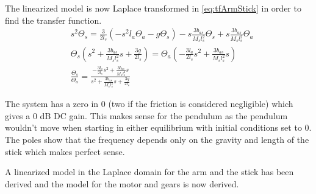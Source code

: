 The linearized model is now Laplace transformed in \autoref{eq:tfArmStick} in order to find the transfer function.
\begin{subequations}
\begin{flalign}
& s^2\Theta_s=\frac{3}{2l_s}\left(-s^2l_a\Theta_a -g\Theta_s\right)-s\frac{3b_{as}}{M_sl_s^2}\Theta_s+s\frac{3b_{as}}{M_sl_s^2}\Theta_a  \\
& \Theta_s\left(s^2+\frac{3b_{as}}{M_sl_s^2}s+\frac{3g}{2l_s}\right)=\Theta_a\left(-\frac{3l_a}{2l_s}s^2+\frac{3b_{as}}{M_sl_s^2}s\right)  \\
& \frac{\Theta_s}{\Theta_a}=\frac{-\frac{3l_a}{2l_s}s^2+\frac{3b_{as}}{M_sl_s^2}s}{s^2+\frac{3b_{as}}{M_sl_s^2}s+\frac{3g}{2l_s}} \label{eq:tfArmStick}
\end{flalign}
\end{subequations}

The system has a zero in 0 (two if the friction is considered negligible) which gives a 0 dB DC gain. This makes sense for the pendulum as the pendulum wouldn't move when starting in either equilibrium with initial conditions set to 0. The poles show that the frequency depends only on the gravity and length of the stick which makes perfect sense.

A linearized model in the Laplace domain for the arm and the stick has been derived and the model for the motor and gears is now derived.
